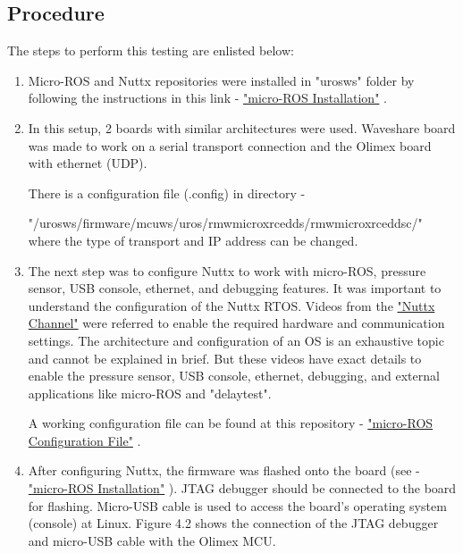 \documentclass[%
xelatex,
	oneside,		%
	12pt,			%
	parskip=half,	%
	abstracton,
	chapterprefix=true%
    appendixprefix=true]
{scrbook}
\begin{document}
	\subsection{Procedure}	
	\vspace*{0.5cm}
	The steps to perform this testing are enlisted below:
\begin{enumerate}
	\item Micro-ROS and Nuttx repositories were installed in "uros\textunderscore ws" folder by following the instructions in this link - \href{https://micro-ros.github.io/docs/tutorials/basic/getting_started/}{"micro-ROS Installation"} \cite{urosinstall}.
	\item In this setup, 2 boards with similar architectures were used. Waveshare board was made to work on a serial transport connection and the Olimex board with ethernet (UDP). 
	
There is a configuration file (.config) in directory -

"/uros\textunderscore ws/firmware/mcu\textunderscore ws/uros/rmw\textunderscore microxrcedds/rmw\textunderscore microxrcedds\textunderscore c/" where the type of transport and IP address can be changed.

	\item The next step was to configure Nuttx to work with micro-ROS, pressure sensor, USB console, ethernet, and debugging features. 
It was important to understand the configuration of the Nuttx RTOS. Videos from the \href{https://www.youtube.com/channel/UC0QciIlcUnjJkL5yJJBmluw/videos}{"Nuttx Channel"} \cite{Nuttxchannel} were referred to enable the required hardware and communication settings. The architecture and configuration of an OS is an exhaustive topic and cannot be explained in brief. But these videos have exact details to enable the pressure sensor, USB console, ethernet, debugging, and external applications like micro-ROS and "delay\textunderscore test". 
	
	A working configuration file can be found at this repository - \href{https://github.com/Viplav04/NuttX/tree/master/configs/olimex-stm32-e407/uros}{"micro-ROS Configuration File"} \cite{olimexconfigfile}.
	\item After configuring Nuttx, the firmware was flashed onto the board (see - \href{https://micro-ros.github.io/docs/tutorials/basic/getting_started/}{"micro-ROS Installation"} \cite{urosinstall}). JTAG debugger should be connected to the board for flashing. Micro-USB cable is used to access the board's operating system (console) at Linux. Figure 4.2 shows the connection of the JTAG debugger and micro-USB cable with the Olimex MCU. 
	

\end{enumerate}
\end{document}
